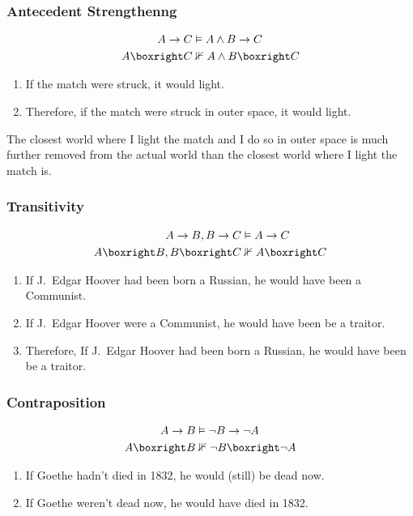 \documentclass[UTF8,11pt,colorlinks,compress,openany]{beamer}%
\begin{document}
\begin{frame}\frametitle{Antecedent Strengthenng}
\begin{align*}
	A\to C&\vDash A\wedge B\to C\\
	A\boxright C&\nVdash A\wedge B\boxright C
\end{align*}
\begin{enumerate}
	\item If the match were struck, it would light.
	\item Therefore, if the match were struck in outer space, it would light.
\end{enumerate}
The closest world where I light the match and I do so in outer space is much further removed from the actual world than the closest world where I light the match is.
\end{frame}

\begin{frame}\frametitle{Transitivity}
\begin{align*}
	A\to B, B\to C&\vDash A\to C\\
	A\boxright B, B\boxright C&\nVdash A\boxright C
\end{align*}
\begin{enumerate}
	\item If J.~Edgar Hoover had been born a Russian, he would have been a Communist.
	\item If J.~Edgar Hoover were a Communist, he would have been be a traitor.
	\item Therefore, If J.~Edgar Hoover had been born a Russian, he would have been be a traitor.
\end{enumerate}
\end{frame}

\begin{frame}\frametitle{Contraposition}
\begin{align*}
A\to B&\vDash \neg B\to \neg A\\
A\boxright B&\nVdash \neg B\boxright \neg A
\end{align*}
\begin{enumerate}
	\item If Goethe hadn't died in 1832, he would (still) be dead now.
	\item If Goethe weren't dead now, he would have died in 1832.
\end{enumerate}
\end{frame}
\end{document}
